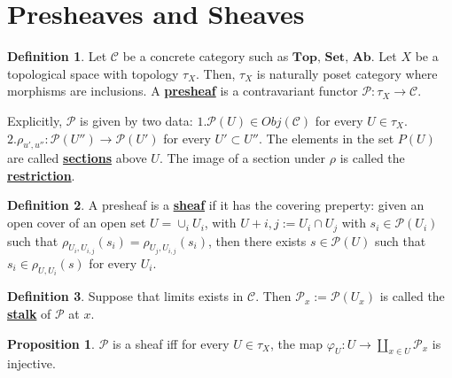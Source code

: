 \documentclass{article}
\theoremstyle{definition}
\theoremstyle{definition}
\newtheorem{definition}{Definition}[theorem]
\theoremstyle{definition}
\theoremstyle{definition}
\newtheorem{proposition}{Proposition}[theorem]
\theoremstyle{definition}
\theoremstyle{definition}
\theoremstyle{definition}
\begin{document}
\section{Presheaves and Sheaves}

\begin{tcolorbox}[colback=purple!5!white,colframe=purple!75!black]
\begin{definition}
Let $\mathcal{C}$ be a concrete category such as $\textbf{Top, Set, Ab}$. Let $X$ be a topological space with topology $\tau_X$. Then, $\tau_X$ is naturally poset category where morphisms are inclusions. A \underline{\textbf{presheaf}} is a contravariant functor $\mathcal{P}: \tau_X\to \mathcal{C}$. 
\end{definition}
\end{tcolorbox}
Explicitly, $\mathcal{P}$ is given by two data: $1. \mathcal{P}(U)\in Obj(\mathcal{C})$ for every $U\in \tau_X$. $2. \rho_{u',u''}: \mathcal{P}(U'')\to \mathcal{P}(U')$ for every $U'\subset U''$. The elements in the set $P(U)$ are called \underline{\textbf{sections}} above $U$. The image of a section under $\rho$ is called the \underline{\textbf{restriction}}. 


\begin{tcolorbox}[colback=purple!5!white,colframe=purple!75!black]
\begin{definition}
A presheaf is a \underline{\textbf{sheaf}} if it has the covering preperty: given an open cover of an open set $U=\cup_i U_i$, with $U+{i,j}:=U_i\cap U_j$ with $s_i\in \mathcal{P}(U_i)$ such that $\rho_{U_i,U_{i,j}}(s_i)=\rho_{U_j,U_{i,j}}(s_i)$, then there exists $s\in \mathcal{P}(U)$ such that $s_i\in \rho_{U,U_i}(s)$ for every $U_i$. 
\end{definition}
\end{tcolorbox}


\begin{tcolorbox}[colback=purple!5!white,colframe=purple!75!black]
\begin{definition}
Suppose that limits exists in $\mathcal{C}$. Then $\mathcal{P}_x:=\mathcal{P}(U_x)$ is called the \underline{\textbf{stalk}}
of $\mathcal{P}$ at $x$. 

\end{definition}
\end{tcolorbox}


\begin{tcolorbox}[colback=blue!5!white,colframe=blue!30!white]
\begin{proposition}
$\mathcal{P}$ is a sheaf iff for every $U\in \tau_X$, the map $\varphi_U: U\to \coprod_{x\in U}\mathcal{P}_x$ is injective. 
\end{proposition}
\end{tcolorbox}
\end{document}

